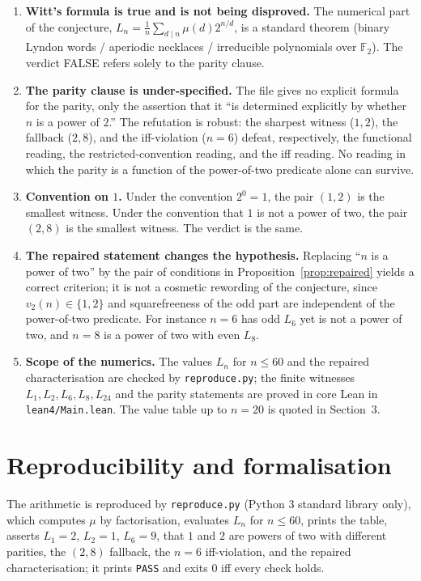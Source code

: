 \documentclass[11pt]{article}
\theoremstyle{definition}
\theoremstyle{remark}
\newcommand{\vtwo}{v_2}
\begin{document}
\begin{enumerate}
\item \textbf{Witt's formula is true and is not being disproved.} The
numerical part of the conjecture, $L_n = \frac1n\sum_{d\mid n}\mu(d)2^{n/d}$,
is a standard theorem (binary Lyndon words / aperiodic necklaces / irreducible
polynomials over $\mathbb{F}_2$). The verdict FALSE refers solely to the parity
clause.
\item \textbf{The parity clause is under-specified.} The file gives no explicit
formula for the parity, only the assertion that it ``is determined explicitly
by whether $n$ is a power of $2$.'' The refutation is robust: the sharpest
witness ($1,2$), the fallback ($2,8$), and the iff-violation ($n=6$) defeat,
respectively, the functional reading, the restricted-convention reading, and
the iff reading. No reading in which the parity is a function of the
power-of-two predicate alone can survive.
\item \textbf{Convention on $1$.} Under the convention $2^0 = 1$, the pair
$(1,2)$ is the smallest witness. Under the convention that $1$ is not a power
of two, the pair $(2,8)$ is the smallest witness. The verdict is the same.
\item \textbf{The repaired statement changes the hypothesis.} Replacing
``$n$ is a power of two'' by the pair of conditions in
Proposition~\ref{prop:repaired} yields a correct criterion; it is not a
cosmetic rewording of the conjecture, since $\vtwo(n) \in \{1,2\}$ and
squarefreeness of the odd part are independent of the power-of-two predicate.
For instance $n=6$ has odd $L_6$ yet is not a power of two, and $n=8$ is a
power of two with even $L_8$.
\item \textbf{Scope of the numerics.} The values $L_n$ for $n \le 60$ and the
repaired characterisation are checked by \texttt{reproduce.py}; the finite
witnesses $L_1, L_2, L_6, L_8, L_{24}$ and the parity statements are proved in
core Lean in \texttt{lean4/Main.lean}. The value table up to $n=20$ is quoted
in Section~3.
\end{enumerate}

\section{Reproducibility and formalisation}

The arithmetic is reproduced by \texttt{reproduce.py} (Python 3 standard
library only), which computes $\mu$ by factorisation, evaluates $L_n$ for
$n \le 60$, prints the table, asserts $L_1 = 2$, $L_2 = 1$, $L_6 = 9$, that
$1$ and $2$ are powers of two with different parities, the $(2,8)$ fallback,
the $n=6$ iff-violation, and the repaired characterisation; it prints
\texttt{PASS} and exits $0$ iff every check holds.
\end{document}
